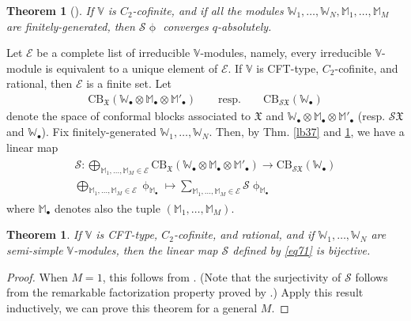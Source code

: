 \documentclass[11pt,b5paper,notitlepage]{article}
\theoremstyle{definition}
\theoremstyle{plain}
\newtheorem{thm}[df]{Theorem}
\newcommand{\fk}{\mathfrak}
\newcommand{\mc}{\mathcal}
\newcommand{\scr}{\mathscr}
\newcommand{\blt}{\bullet}
\newcommand{\Vbb}{\mathbb V}
\newcommand{\Wbb}{\mathbb W}
\newcommand{\Mbb}{\mathbb M}
\newcommand{\CB}{\mathrm{CB}}
\numberwithin{equation}{subsection}
\begin{document}



\begin{thm}[{\cite[Thm. 13.1]{Gui24a}}]\label{lb39}
If $\Vbb$ is $C_2$-cofinite, and if all the modules $\Wbb_1,\dots,\Wbb_N,\Mbb_1,\dots,\Mbb_M$ are finitely-generated, then $\scr S\upphi$ converges $q$-absolutely.
\end{thm}





Let $\mc E$ be a complete list of irreducible $\Vbb$-modules, namely, every irreducible $\Vbb$-module is equivalent to a unique element of $\mc E$. If $\Vbb$ is CFT-type, $C_2$-cofinite, and rational, then $\mc E$ is a finite set. Let
\begin{align*}
\CB_{\fk X}(\Wbb_\blt\otimes\Mbb_\blt\otimes\Mbb'_\blt)\qquad\text{resp.}\qquad \CB_{\scr S\fk X}(\Wbb_\blt)	
\end{align*}
denote the space of conformal blocks associated to $\fk X$ and $\Wbb_\blt\otimes\Mbb_\blt\otimes\Mbb'_\blt$ (resp. $\scr S\fk X$ and $\Wbb_\blt$). Fix finitely-generated $\Wbb_1,\dots,\Wbb_N$. Then,  by Thm. \ref{lb37} and \ref{lb39}, we have a linear map
\begin{gather}
\begin{array}{c}
\scr S:\bigoplus_{\Mbb_1,\dots,\Mbb_M\in\mc E}\CB_{\fk X}(\Wbb_\blt\otimes\Mbb_\blt\otimes\Mbb'_\blt)\rightarrow\CB_{\scr S\fk X}(\Wbb_\blt)	\\[0.8ex]
\bigoplus_{\Mbb_1,\dots,\Mbb_M\in\mc E}\upphi_{\Mbb_\blt}\mapsto\sum _{\Mbb_1,\dots,\Mbb_M\in\mc E}\scr S\upphi_{\Mbb_\blt}
\end{array}	\label{eq71}
\end{gather}
where $\Mbb_\blt$ denotes also the tuple $(\Mbb_1,\dots,\Mbb_M)$.



\begin{thm}\label{lb40}
If $\Vbb$ is CFT-type, $C_2$-cofinite, and rational, and if $\Wbb_1,\dots,\Wbb_N$ are semi-simple $\Vbb$-modules, then the linear map $\scr S$ defined by \eqref{eq71} is bijective.
\end{thm}


\begin{proof}
When $M=1$, this follows from \cite[Thm. 12.1]{Gui24a}. (Note that the surjectivity of $\scr S$ follows from the remarkable factorization property proved by \cite{DGT22}.) Apply this result inductively, we can prove this theorem for a general $M$.
\end{proof}
\end{document}

